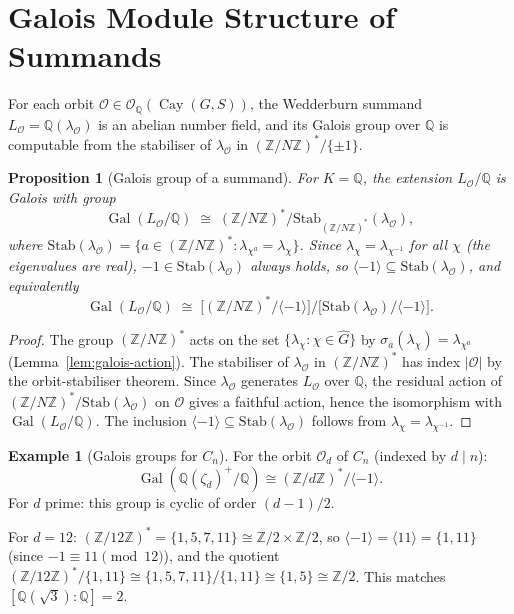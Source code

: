 \documentclass[12pt]{amsart}
\numberwithin{equation}{section}
\theoremstyle{plain}
\newtheorem{proposition}[theorem]{Proposition}
\theoremstyle{definition}
\newtheorem{example}[theorem]{Example}
\DeclareMathOperator{\Gal}{Gal}
\DeclareMathOperator{\Cay}{Cay}
\newcommand{\Z}{\mathbb{Z}}
\newcommand{\Q}{\mathbb{Q}}
\newcommand{\calO}{\mathcal{O}}
\newcommand{\Ghat}{\widehat{G}}
\begin{document}
\section{Galois Module Structure of Summands}
\label{sec:galois-structure}

For each orbit $\calO \in \calO_\Q(\Cay(G,S))$, the Wedderburn summand
$L_\calO = \Q(\lambda_\calO)$ is an abelian number field, and its Galois
group over $\Q$ is computable from the stabiliser of $\lambda_\calO$ in
$(\Z/N\Z)^*/\{\pm 1\}$.

\begin{proposition}[Galois group of a summand]
\label{prop:galois-group}
For $K = \Q$, the extension $L_\calO/\Q$ is Galois with group
\[
  \Gal(L_\calO/\Q) \;\cong\;
  (\Z/N\Z)^* \Big/ \mathrm{Stab}_{(\Z/N\Z)^*}(\lambda_\calO),
\]
where $\mathrm{Stab}(\lambda_\calO) = \{a \in (\Z/N\Z)^* :
\lambda_{\chi^a} = \lambda_\chi\}$.  Since $\lambda_\chi = \lambda_{\chi^{-1}}$
for all $\chi$ (the eigenvalues are real), $-1 \in \mathrm{Stab}(\lambda_\calO)$
always holds, so $\langle -1 \rangle \subseteq \mathrm{Stab}(\lambda_\calO)$,
and equivalently
\[
  \Gal(L_\calO/\Q) \;\cong\;
  \bigl[(\Z/N\Z)^*/\langle -1 \rangle\bigr]
  \Big/ \bigl[\mathrm{Stab}(\lambda_\calO)/\langle -1\rangle\bigr].
\]
\end{proposition}

\begin{proof}
The group $(\Z/N\Z)^*$ acts on the set $\{\lambda_\chi : \chi \in \Ghat\}$
by $\sigma_a(\lambda_\chi) = \lambda_{\chi^a}$ (Lemma~\ref{lem:galois-action}).
The stabiliser of $\lambda_\calO$ in $(\Z/N\Z)^*$ has index $|\calO|$ by the
orbit-stabiliser theorem.  Since $\lambda_\calO$ generates $L_\calO$ over
$\Q$, the residual action of $(\Z/N\Z)^*/\mathrm{Stab}(\lambda_\calO)$ on
$\calO$ gives a faithful action, hence the isomorphism with $\Gal(L_\calO/\Q)$.
The inclusion $\langle -1 \rangle \subseteq \mathrm{Stab}(\lambda_\calO)$
follows from $\lambda_\chi = \lambda_{\chi^{-1}}$.
\end{proof}

\begin{example}[Galois groups for $C_n$]
For the orbit $\calO_d$ of $C_n$ (indexed by $d \mid n$):
\[
\Gal(\Q(\zeta_d)^+/\Q) \cong (\Z/d\Z)^*/\langle -1 \rangle.
\]
For $d$ prime: this group is cyclic of order $(d-1)/2$.
\begin{sloppypar}
For $d = 12$: $(\Z/12\Z)^* = \{1,5,7,11\} \cong \Z/2 \times \Z/2$,
so $\langle -1 \rangle = \langle 11 \rangle = \{1,11\}$
(since $-1 \equiv 11 \pmod{12}$), and the quotient
$(\Z/12\Z)^*/\{1,11\} \cong \{1,5,7,11\}/\{1,11\} \cong \{1,5\} \cong \Z/2$.
This matches $[\Q(\sqrt{3}):\Q] = 2$.
\end{sloppypar}
\end{example}
\end{document}
